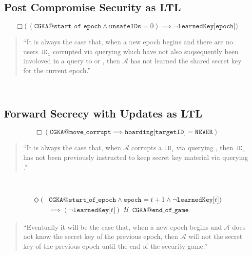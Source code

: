 \hypertarget{sec:pcs-as-ltl}{%
\subsection{Post Compromise Security as LTL}\label{sec:pcs-as-ltl}}

\begin{LTL}
\[
    \Box \Big(\, ( \texttt{CGKA@start\_of\_epoch} \land \texttt{unsafeIDs} = 0 ) \implies \neg \texttt{learnedKey[epoch]} \Big)
\]
\begin{quotation}
``It is always the case that, when a new epoch begins and there are no users \(\mathtt{ID_{i}}\) corrupted via querying  which have not also suqsequently been involoved in a query to  or , then \(\mathcal{A}\) has not learned the shared secret key for the current epoch.''
\end{quotation}\\
\end{LTL}


\hypertarget{sec:fsu-as-ltl}{%
\subsection{Forward Secrecy with Updates as LTL}\label{sec:fsu-as-ltl}}

\begin{LTL}
\[
    \Box \left( \texttt{CGKA@move\_corrupt} \implies \texttt{hoarding[targetID]} = \texttt{NEVER} \right)
\]
\begin{quotation}
``It is always the case that, when \(\mathcal{A}\) corrupts a \(\mathtt{ID_{i}}\) via querying , then \(\mathtt{ID_{i}}\) has not been previously instructed to keep secret key material via querying .''
\end{quotation}\\
\end{LTL}


\begin{LTL}
\begin{equation*}
\begin{split}
    \Diamond ( & \texttt{CGKA@start\_of\_epoch} \land \texttt{epoch} = t + 1 \land \neg \texttt{learnedKey[$t$]} ) \\
               & \implies ( \neg \texttt{learnedKey[$t$]} ) \,\;{\mathcal {U}}\;\, \texttt{CGKA@end\_of\_game}
\end{split}
\end{equation*}
\begin{quotation}
``Eventually it will be the case that, when a new epoch begins and \(\mathcal{A}\) does not know the secret key of the previous epoch, then \(\mathcal{A}\) will not the secret key of the previous epoch until the end of the \CGKAsec security game.''
\end{quotation}\\
\end{LTL}

